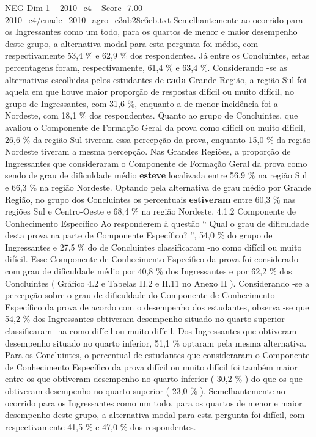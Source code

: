 \begin{textsample}{NEG Dim 1 – 2010\_c4 – Score -7.00 – 2010\_c4/enade\_2010\_agro\_c3ab28c6eb.txt}
Semelhantemente ao ocorrido para os Ingressantes como um todo, para os quartos de menor e maior desempenho deste grupo, a alternativa modal para esta pergunta foi médio, com respectivamente 53,4 \% e 62,9 \% dos respondentes.
Já entre os Concluintes, estas percentagens foram, respectivamente, 61,4 \% e 63,4 \%.
Considerando -se as alternativas escolhidas pelos estudantes de \textbf{cada} Grande Região, a região Sul foi aquela em que houve maior proporção de respostas difícil ou muito difícil, no grupo de Ingressantes, com 31,6 \%, enquanto a de menor incidência foi a Nordeste, com 18,1 \% dos respondentes.
Quanto ao grupo de Concluintes, que avaliou o Componente de Formação Geral da prova como difícil ou muito difícil, 26,6 \% da região Sul tiveram essa percepção da prova, enquanto 15,0 \% da região Nordeste tiveram a mesma percepção.
Nas Grandes Regiões, a proporção de Ingressantes que consideraram o Componente de Formação Geral da prova como sendo de grau de dificuldade médio \textbf{esteve} localizada entre 56,9 \% na região Sul e 66,3 \% na região Nordeste.
Optando pela alternativa de grau médio por Grande Região, no grupo dos Concluintes os percentuais \textbf{estiveram} entre 60,3 \% nas regiões Sul e Centro-Oeste e 68,4 \% na região Nordeste. 4.1.2 Componente de Conhecimento Específico Ao responderem à questão “ Qual o grau de dificuldade desta prova na parte de Componente Específico? ”, 54,0 \% do grupo de Ingressantes e 27,5 \% do de Concluintes classificaram -no como difícil ou muito difícil.
Esse Componente de Conhecimento Específico da prova foi considerado com grau de dificuldade médio por 40,8 \% dos Ingressantes e por 62,2 \% dos Concluintes ( Gráfico 4.2 e Tabelas II.2 e II.11 no Anexo II ).
Considerando -se a percepção sobre o grau de dificuldade do Componente de Conhecimento Específico da prova de acordo com o desempenho dos estudantes, observa -se que 54,2 \% dos Ingressantes obtiveram desempenho situado no quarto superior classificaram -na como difícil ou muito difícil.
Dos Ingressantes que obtiveram desempenho situado no quarto inferior, 51,1 \% optaram pela mesma alternativa.
Para os Concluintes, o percentual de estudantes que consideraram o Componente de Conhecimento Específico da prova difícil ou muito difícil foi também maior entre os que obtiveram desempenho no quarto inferior ( 30,2 \% ) do que os que obtiveram desempenho no quarto superior ( 23,0 \% ).
Semelhantemente ao ocorrido para os Ingressantes como um todo, para os quartos de menor e maior desempenho deste grupo, a alternativa modal para esta pergunta foi difícil, com respectivamente 41,5 \% e 47,0 \% dos respondentes.

\end{textsample}
